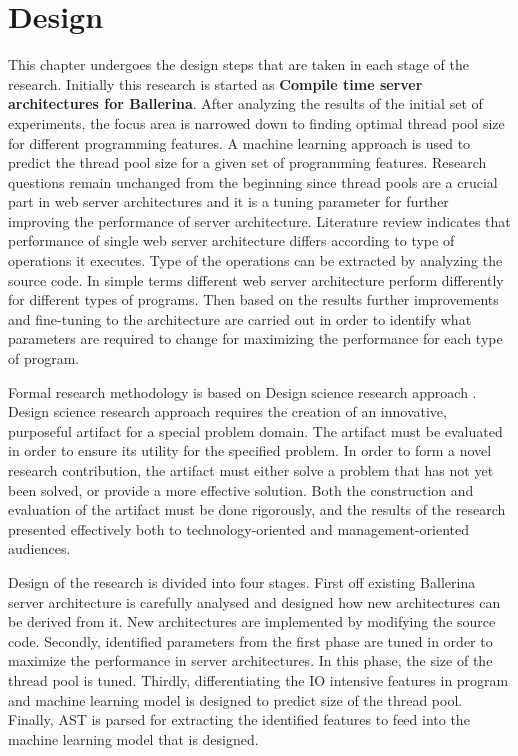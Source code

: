 \chapter{Design}\label{chap:3}


This chapter undergoes the design steps that are taken in each stage of the research. Initially this research is started as\textbf{ Compile time server architectures for Ballerina}. After analyzing the results of the initial set of experiments, the focus area is narrowed down to finding optimal thread pool size for different programming features. A machine learning approach is used to predict the thread pool size for a given set of programming features. Research questions remain unchanged from the beginning since thread pools are a crucial part in web server architectures and it is a tuning parameter for further improving the performance of server architecture. Literature review indicates that performance of single web server architecture differs according to type of operations it executes. Type of the operations can be extracted by analyzing the source code.  In simple terms different web server architecture perform differently for different types of programs. Then based on the results further improvements and fine-tuning to the architecture are carried out in order to identify what parameters are required to change for maximizing the performance for each type of program. 

Formal research methodology is based on Design science research approach \cite{design_science}. Design science research approach requires the creation of an innovative, purposeful artifact for a special problem domain. The artifact must be evaluated in order to ensure its utility for the specified problem. In order to form a novel research contribution, the artifact must either solve a problem that has not yet been solved, or provide a more effective solution. Both the construction and evaluation of the artifact must be done rigorously, and the results of the research presented effectively both to technology-oriented and management-oriented audiences.

Design of the research is divided into four stages. First off existing Ballerina server architecture is carefully analysed and designed how new architectures can be derived from it. New architectures are implemented by modifying the source code. Secondly, identified parameters from the first phase are tuned in order to maximize the performance in server architectures. In this phase, the size of the thread pool is tuned. Thirdly, differentiating the IO intensive features in program and machine learning model is designed to predict size of the thread pool. Finally, \acrshort{AST} is parsed for extracting the identified features to feed into the machine learning model that is designed.

